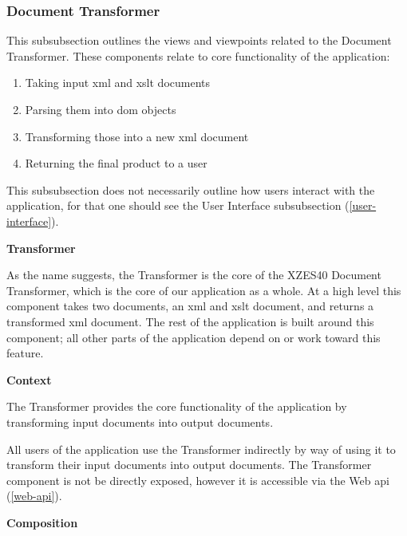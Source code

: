 \subsubsection{Document Transformer}
\label{document-transformer}

This subsubsection outlines the views and viewpoints related to the Document Transformer.
These components relate to core functionality of the application:

\begin{enumerate}
\item Taking input \gls{xml} and \gls{xslt} documents
\item Parsing them into \gls{dom} objects
\item Transforming those into a new \gls{xml} document
\item Returning the final product to a user
\end{enumerate}

This subsubsection does not necessarily outline how users interact with the application, for that one should see the User Interface subsubsection (\ref{user-interface}).

\textbf{Transformer}
\label{transformer}

As the name suggests, the Transformer is the core of the XZES40 Document Transformer, which is the core of our application as a whole.
At a high level this component takes two documents, an \gls{xml} and \gls{xslt} document, and returns a transformed \gls{xml} document.
The rest of the application is built around this component; all other parts of the application depend on or work toward this feature.

\textbf{Context}

The Transformer provides the core functionality of the application by transforming input documents into output documents.

All users of the application use the Transformer indirectly by way of using it to transform their input documents into output documents.
The Transformer component is not be directly exposed, however it is accessible via the Web \gls{api} (\ref{web-api}).

\textbf{Composition}

